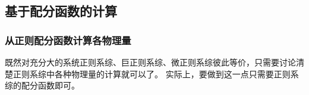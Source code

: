 \documentclass[hyperref, UTF8, a4paper]{ctexart}
\begin{document}
\subsection{基于配分函数的计算}


\subsubsection{从正则配分函数计算各物理量}\label{sec:calculation-from-canonical-partition}

既然对充分大的系统正则系综、巨正则系综、微正则系综彼此等价，只需要讨论清楚正则系综中各种物理量的计算就可以了。
实际上，要做到这一点只需要正则系综的配分函数即可。
\end{document}
